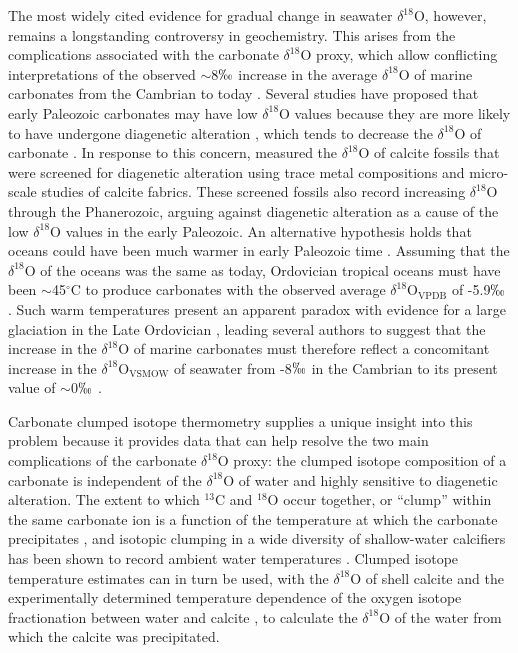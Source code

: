 \documentclass[5p, authoryear]{elsarticle}
\begin{document}
The most widely cited evidence for gradual change in seawater $\delta^{18}$O, however, remains a longstanding controversy in geochemistry. This arises from the complications associated with the carbonate $\delta^{18}$O proxy, which allow conflicting interpretations of the observed $\sim$8$\permil$ increase in the average $\delta^{18}$O of marine carbonates from the Cambrian to today \citep{Jaffres2007, Veizer1999}. Several studies have proposed that early Paleozoic carbonates may have low $\delta^{18}$O values because they are more likely to have undergone diagenetic alteration \citep{Clayton1959, Keith1964, Land1995}, which tends to decrease the $\delta^{18}$O of carbonate \citep{Marshall1992}. In response to this concern, \cite{Veizer1999} measured the $\delta^{18}$O of calcite fossils that were screened for diagenetic alteration using trace metal compositions and micro-scale studies of calcite fabrics. These screened fossils also record increasing $\delta^{18}$O through the Phanerozoic, arguing against diagenetic alteration as a cause of the low $\delta^{18}$O values in the early Paleozoic. An alternative hypothesis holds that oceans could have been much warmer in early Paleozoic time \citep{Karhu1986, Knauth1976}. Assuming that the $\delta^{18}$O of the oceans was the same as today, Ordovician tropical oceans must have been $\sim$45$^{\circ}$C to produce carbonates with the observed average $\delta^{18}$O$_{\text{VPDB}}$ of -5.9$\permil$ \citep{Veizer1999}. Such warm temperatures present an apparent paradox with evidence for a large glaciation in the Late Ordovician \citep{Veizer1986}, leading several authors to suggest that the increase in the $\delta^{18}$O of marine carbonates must therefore reflect a concomitant increase in the $\delta^{18}$O$_{\text{VSMOW}}$ of seawater from -8$\permil$ in the Cambrian to its present value of $\sim$0$\permil$ \citep{Jaffres2007, Veizer1999}. 

Carbonate clumped isotope thermometry supplies a unique insight into this problem because it provides data that can help resolve the two main complications of the carbonate $\delta^{18}$O proxy: the clumped isotope composition of a carbonate is independent of the $\delta^{18}$O of water and highly sensitive to diagenetic alteration. The extent to which $^{13}$C and $^{18}$O occur together, or ``clump'' within the same carbonate ion is a function of the temperature at which the carbonate precipitates \citep{Eiler2011}, and isotopic clumping in a wide diversity of shallow-water calcifiers has been shown to record ambient water temperatures \citep{Ghosh2006, Henkes2013, Saenger2012, Tripati2010}. Clumped isotope temperature estimates can in turn be used, with the $\delta^{18}$O of shell calcite and the experimentally determined temperature dependence of the oxygen isotope fractionation between water and calcite \citep{Kim1997}, to calculate the $\delta^{18}$O of the water from which the calcite was precipitated.
\end{document}
